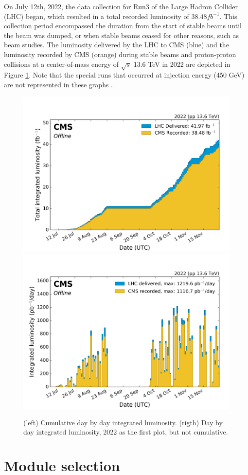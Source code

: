 On July 12th, 2022, the data collection for Run3 of the Large Hadron Collider (LHC) began, which resulted in a total recorded luminosity of $38.48 fb^{-1}$. This collection period encompassed the duration from the start of stable beams until the beam was dumped, or when stable beams ceased for other reasons, such as beam studies. The luminosity delivered by the LHC to CMS (blue) and the luminosity recorded by CMS (orange) during stable beams and proton-proton collisions at a center-of-mass energy of $\sqrt{s}$ 13.6 TeV in 2022 are depicted in Figure \ref{Lumi_2022}. Note that  the special runs that occurred at injection energy (450 GeV) are not represented in these graphs \citep{wikicern}.

\begin{center}
  \begin{figure}[h!]
    \centering
    \includegraphics[width=.45\textwidth]{Chapter3/lumi_per_day_cumulative_pp_2022.png}
    \includegraphics[width=.45\textwidth]{Chapter3/lumi_per_day_pp_2022.png}
    \caption[Cumulative day-by-day integrated luminosity in 2022]{(left) Cumulative day by day integrated luminosity. (rigth) Day by day integrated luminosity, 2022 as the first plot, but not cumulative.} 
    \label{Lumi_2022}
  \end{figure}
\end{center}

\section{Module selection}

